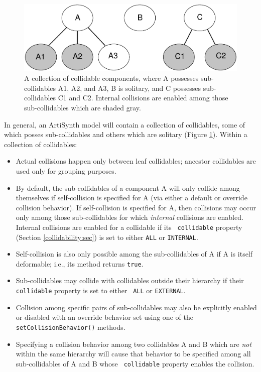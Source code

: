 \begin{figure}[ht]
\begin{center}
 \includegraphics[width=5in]{images/CollidableGroups}
\end{center}
\caption{A collection of collidable components, where A possesses
sub-collidables A1, A2, and A3, B is solitary, and C possesses
sub-collidables C1 and C2. Internal collisions are enabled among those
sub-collidables which are shaded gray.}
\label{CollidableGroups:fig}
\end{figure}

In general, an ArtiSynth model will contain a collection of
collidables, some of which posses sub-collidables and others which are
solitary (Figure \ref{CollidableGroups:fig}).  Within a collection of
collidables:

\begin{itemize}

\item Actual collisions happen only between leaf collidables; ancestor
collidables are used only for grouping purposes.

\item By default, the sub-collidables of a component A will only
collide among themselves if self-collision is specified for A (via
either a default or override collision behavior). If self-collision is
specified for A, then collisions may occur only among those
sub-collidables for which {\it internal} collisions are enabled.
Internal collisions are enabled for a collidable if its {\tt
collidable} property (Section \ref{collidability:sec}) is set to
either {\tt ALL} or {\tt INTERNAL}.

\item Self-collision is also only possible among the sub-collidables
of A if A is itself deformable; i.e., its
method returns {\tt true}.

\item Sub-collidables may collide with collidables outside their
hierarchy if their {\tt collidable} property is set to either {\tt
ALL} or {\tt EXTERNAL}.

\item Collision among specific pairs of sub-collidables may also be
explicitly enabled or disabled with an override behavior set using one
of the {\tt setCollisionBehavior()} methods.

\item Specifying a collision behavior among two collidables A and B
which are {\it not} within the same hierarchy will cause that behavior
to be specified among all sub-collidables of A and B whose {\tt
collidable} property enables the collision.

\end{itemize}

